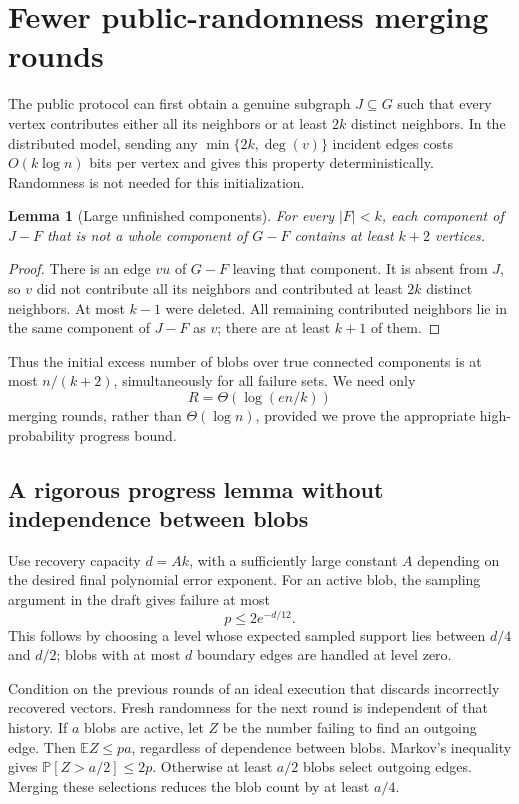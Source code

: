 \documentclass[11pt]{article}
\newtheorem{lemma}[theorem]{Lemma}
\theoremstyle{remark}\newtheorem{remark}[theorem]{Remark}
\newcommand{\E}{\mathbb E}
\newcommand{\Prb}{\mathbb P}
\begin{document}
\section{Fewer public-randomness merging rounds}\label{sec:public}
The public protocol can first obtain a genuine subgraph $J\subseteq G$ such that every vertex contributes either all its neighbors or at least $2k$ distinct neighbors. In the distributed model, sending any $\min\{2k,\deg(v)\}$ incident edges costs $O(k\log n)$ bits per vertex and gives this property deterministically. Randomness is not needed for this initialization.

\begin{lemma}[Large unfinished components]
For every $|F|<k$, each component of $J-F$ that is not a whole component of $G-F$ contains at least $k+2$ vertices.
\end{lemma}
\begin{proof}
There is an edge $vu$ of $G-F$ leaving that component. It is absent from $J$, so $v$ did not contribute all its neighbors and contributed at least $2k$ distinct neighbors. At most $k-1$ were deleted. All remaining contributed neighbors lie in the same component of $J-F$ as $v$; there are at least $k+1$ of them.
\end{proof}

Thus the initial excess number of blobs over true connected components is at most $n/(k+2)$, simultaneously for all failure sets. We need only
\[
 R=\Theta(\log(en/k))
\]
merging rounds, rather than $\Theta(\log n)$, provided we prove the appropriate high-probability progress bound.

\subsection{A rigorous progress lemma without independence between blobs}
Use recovery capacity $d=A k$, with a sufficiently large constant $A$ depending on the desired final polynomial error exponent. For an active blob, the sampling argument in the draft gives failure at most
\[
 p\le2e^{-d/12}.
\]
This follows by choosing a level whose expected sampled support lies between $d/4$ and $d/2$; blobs with at most $d$ boundary edges are handled at level zero.

Condition on the previous rounds of an ideal execution that discards incorrectly recovered vectors. Fresh randomness for the next round is independent of that history. If $a$ blobs are active, let $Z$ be the number failing to find an outgoing edge. Then $\E Z\le pa$, regardless of dependence between blobs. Markov's inequality gives $\Prb[Z>a/2]\le2p$. Otherwise at least $a/2$ blobs select outgoing edges. Merging these selections reduces the blob count by at least $a/4$.
\end{document}
